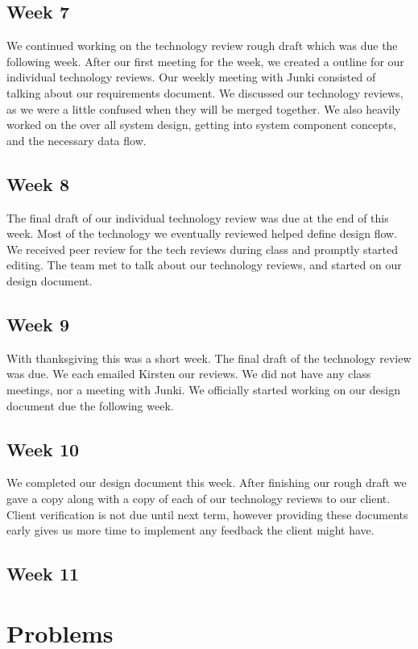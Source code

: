 \documentclass[onecolumn, draftclsnofoot,10pt, compsoc]{IEEEtran}
\begin{document}
		\subsection{Week 7}
		We continued working on the technology review rough draft which was due the following week.
		After our first meeting for the week, we created a outline for our individual technology reviews.
		Our weekly meeting with Junki consisted of talking about our requirements document.
		We discussed our technology reviews, as we were a little confused when they will be merged together.
		We also heavily worked on the over all system design, getting into system component concepts, and the necessary data flow.

		\subsection{Week 8}
		The final draft of our individual technology review was due at the end of this week. Most of the technology we eventually reviewed helped define design flow.
		We received peer review for the tech reviews during class and promptly started editing.
		The team met to talk about our technology reviews, and started on our design document.

		\subsection{Week 9}
		With thanksgiving this was a short week. The final draft of the technology review was due. We each emailed Kirsten our reviews.
		We did not have any class meetings, nor a meeting with Junki.
		We officially started working on our design document due the following week.

		\subsection{Week 10}
		We completed our design document this week. After finishing our rough draft we gave a copy along with a copy of each of our technology reviews to our client.
		Client verification is not due until next term, however providing these documents early gives us more time to implement any feedback the client might have.

		\subsection{Week 11}

		\section{Problems}
\end{document}
